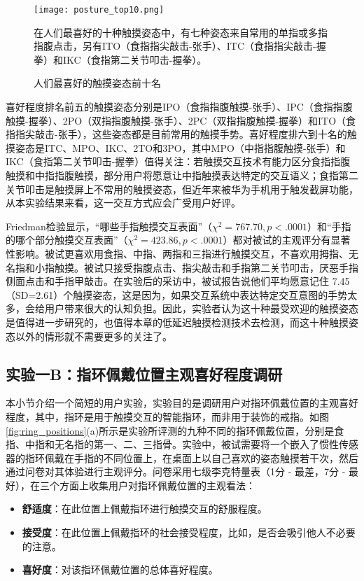\begin{figure}
	\centering
	\texttt{[image: posture\_top10.png]}
	\caption*{在人们最喜好的十种触摸姿态中，有七种姿态来自常用的单指或多指指腹点击，另有ITO（食指指尖敲击-张手）、ITC（食指指尖敲击-握拳）和IKC（食指第二关节叩击-握拳）。}
	\caption{人们最喜好的触摸姿态前十名}
	\label{fig:posture_top10}
\end{figure}

喜好程度排名前五的触摸姿态分别是IPO（食指指腹触摸-张手）、IPC（食指指腹触摸-握拳）、2PO（双指指腹触摸-张手）、2PC（双指指腹触摸-握拳）和ITO（食指指尖敲击-张手），这些姿态都是目前常用的触摸手势。喜好程度排六到十名的触摸姿态是ITC、MPO、IKC、2TO和3PO，其中MPO（中指指腹触摸-张手）和IKC（食指第二关节叩击-握拳）值得关注：若触摸交互技术有能力区分食指指腹触摸和中指指腹触摸，部分用户将愿意让中指触摸表达特定的交互语义；食指第二关节叩击是触摸屏上不常用的触摸姿态，但近年来被华为手机用于触发截屏功能，从本实验结果来看，这一交互方式应会广受用户好评。

Friedman检验显示，“哪些手指触摸交互表面”（$\chi^2=767.70, p<.0001$）和“手指的哪个部分触摸交互表面”（$\chi^2=423.86, p<.0001$）都对被试的主观评分有显著性影响。被试更喜欢用食指、中指、两指和三指进行触摸交互，不喜欢用拇指、无名指和小指触摸。被试只接受指腹点击、指尖敲击和手指第二关节叩击，厌恶手指侧面点击和手指甲敲击。在实验后的采访中，被试报告说他们平均愿意记住 7.45（SD=2.61）个触摸姿态，这是因为，如果交互系统中表达特定交互意图的手势太多，会给用户带来很大的认知负担。因此，实验者认为这十种最受欢迎的触摸姿态是值得进一步研究的，也值得本章的低延迟触摸检测技术去检测，而这十种触摸姿态以外的情形就不需要更多的关注了。

\subsection{实验一B：指环佩戴位置主观喜好程度调研}

本小节介绍一个简短的用户实验，实验目的是调研用户对指环佩戴位置的主观喜好程度，其中，指环是用于触摸交互的智能指环，而非用于装饰的戒指。如图\ref{fig:ring_positions}(a)所示是实验所评测的九种不同的指环佩戴位置，分别是食指、中指和无名指的第一、二、三指骨。实验中，被试需要将一个嵌入了惯性传感器的指环佩戴在手指的不同位置上，在桌面上以自己喜欢的姿态触摸若干次，然后通过问卷对其体验进行主观评分。问卷采用七级李克特量表（1分 - 最差，7分 - 最好），在三个方面上收集用户对指环佩戴位置的主观看法：

\begin{itemize}
	\item \textbf{舒适度}：在此位置上佩戴指环进行触摸交互的舒服程度。
	\item \textbf{接受度}：在此位置上佩戴指环的社会接受程度，比如，是否会吸引他人不必要的注意。
	\item \textbf{喜好度}：对该指环佩戴位置的总体喜好程度。
\end{itemize}

